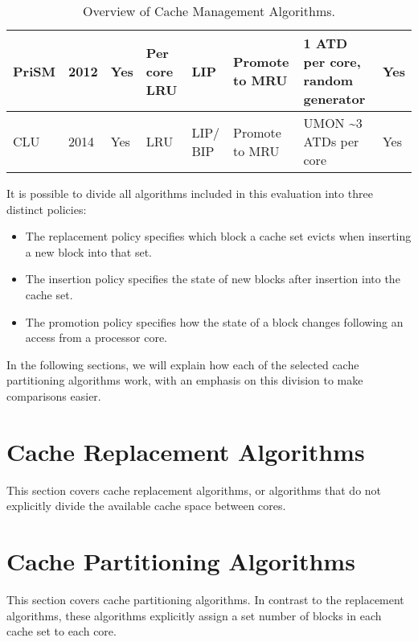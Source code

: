 \begin{table}[thb]
\begin{tabular}{p{1.4cm}p{0.5cm}p{0.8cm}p{1.2cm}p{1.2cm}p{1.4cm}p{1.2cm}p{1.0cm}}
PriSM                           & 2012                           & Yes                         & Per core LRU                  & LIP                           & Promote to MRU                 & 1 ATD per core, random generator                       & Yes  \\ \hline
CLU                             & 2014                           & Yes                         & LRU                              & LIP/ BIP                        & Promote to MRU            & UMON \textasciitilde3 ATDs per core                & Yes  \\ 
\bottomrule
\end{tabular}
\caption{Overview of Cache Management Algorithms.}
\label{tbl:algorithms}
\end{table}
\clearpage

It is possible to divide all algorithms included in this evaluation into three distinct policies:
\begin{itemize}
\item The replacement policy specifies which block a cache set evicts when inserting a new block into that set.
\item The insertion policy specifies the state of new blocks after insertion into the cache set.
\item The promotion policy specifies how the state of a block changes following an access from a processor core.
\end{itemize}
In the following sections, we will explain how each of the selected cache partitioning algorithms work, with an emphasis on this division to make comparisons easier.

\section{Cache Replacement Algorithms}
This section covers cache replacement algorithms, or algorithms that do not explicitly divide the available cache space between cores.









\section{Cache Partitioning Algorithms}
This section covers cache partitioning algorithms.
In contrast to the replacement algorithms, these algorithms explicitly assign a set number of blocks in each cache set to each core.




